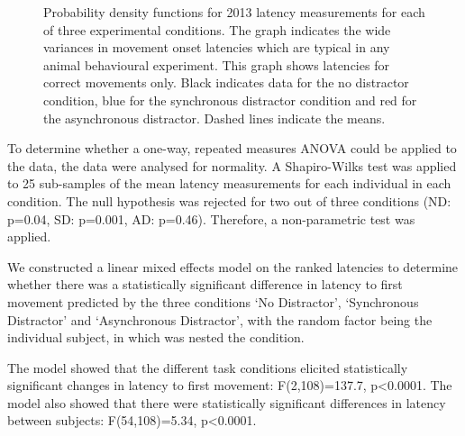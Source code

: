 \documentclass[10pt,letterpaper]{article}
\begin{document}
\begin{figure}[htb!]
\centering
\caption[Latency measurement PDF] {Probability density functions for
  2013 latency measurements for each of three experimental
  conditions. The graph indicates the wide variances in movement onset
  latencies which are typical in any animal behavioural
  experiment. This graph shows latencies for correct movements
  only. Black indicates data for the no distractor condition, blue for
  the synchronous distractor condition and red for the asynchronous
  distractor. Dashed lines indicate the means.}
\label{data_density}
\end{figure}

To determine whether a one-way, repeated measures ANOVA could be
applied to the data, the data were analysed for normality. A
Shapiro-Wilks test was applied to 25 sub-samples of the mean latency
measurements for each individual in each condition.
The null hypothesis was rejected for two out of three conditions (ND:
p=0.04, SD: p=0.001, AD: p=0.46). Therefore, a non-parametric test was
applied.

We constructed a linear mixed effects model on the ranked latencies to
determine whether there was a statistically significant difference in
latency to first movement predicted by the three conditions `No
Distractor', `Synchronous Distractor' and `Asynchronous
Distractor', with the random factor being the individual subject, in
which was nested the condition.

The model showed that the different task conditions elicited
statistically significant changes in latency to first movement:
F(2,108)=137.7, p\textless0.0001. The model also showed that there
were statistically significant differences in latency between
subjects: F(54,108)=5.34, p\textless0.0001.
\end{document}
